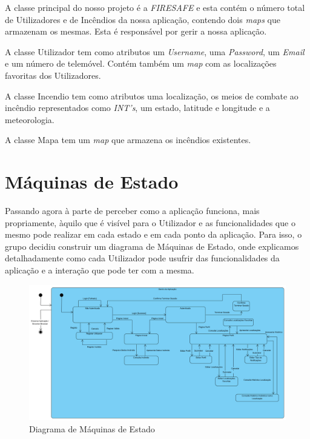 \documentclass[a4paper,12pt]{scrreprt}
\newcommand{\tab}{
    \hspace{1cm}}
\begin{document}
\tab A classe principal do nosso projeto é a \textit{FIRESAFE} e esta contém o número total de Utilizadores e de Incêndios da nossa aplicação, contendo dois \textit{maps} que armazenam os mesmas. Esta é responsável por gerir a nossa aplicação.

\tab A classe Utilizador tem como atributos um \textit{Username}, uma \textit{Password}, um \textit{Email} e um número de telemóvel. Contém também um \textit{map} com as localizações favoritas dos Utilizadores.

\tab A classe Incendio tem como atributos uma localização, os meios de combate ao incêndio representados como \textit{INT's}, um estado, latitude e longitude e a meteorologia.

\tab A classe Mapa tem um \textit{map} que armazena os incêndios existentes.


\chapter{Máquinas de Estado}
\tab Passando agora à parte de perceber como a aplicação funciona, mais propriamente, àquilo que é visível para o Utilizador e as funcionalidades que o mesmo pode realizar em cada estado e em cada ponto da aplicação. Para isso, o grupo decidiu construir um diagrama de Máquinas de Estado, onde explicamos detalhadamente como cada Utilizador pode usufrir das funcionalidades da aplicação e a interação que pode ter com a mesma.

\vspace{1.5cm}

\begin{figure}[hbt!]
    \centering
    \includegraphics[width=1\textwidth]{images/Fase2/09.MaquinasDeEstado/diagramaEstado.png}
    \caption{Diagrama de Máquinas de Estado}
\end{figure}
\end{document}
